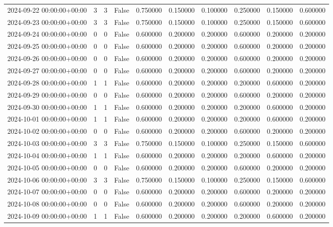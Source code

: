 \begin{tabular}{lrrrrrrrrr}
2024-09-22 00:00:00+00:00 & 3 & 3 & False & 0.750000 & 0.150000 & 0.100000 & 0.250000 & 0.150000 & 0.600000 \\
2024-09-23 00:00:00+00:00 & 3 & 3 & False & 0.750000 & 0.150000 & 0.100000 & 0.250000 & 0.150000 & 0.600000 \\
2024-09-24 00:00:00+00:00 & 0 & 0 & False & 0.600000 & 0.200000 & 0.200000 & 0.600000 & 0.200000 & 0.200000 \\
2024-09-25 00:00:00+00:00 & 0 & 0 & False & 0.600000 & 0.200000 & 0.200000 & 0.600000 & 0.200000 & 0.200000 \\
2024-09-26 00:00:00+00:00 & 0 & 0 & False & 0.600000 & 0.200000 & 0.200000 & 0.600000 & 0.200000 & 0.200000 \\
2024-09-27 00:00:00+00:00 & 0 & 0 & False & 0.600000 & 0.200000 & 0.200000 & 0.600000 & 0.200000 & 0.200000 \\
2024-09-28 00:00:00+00:00 & 1 & 1 & False & 0.600000 & 0.200000 & 0.200000 & 0.200000 & 0.600000 & 0.200000 \\
2024-09-29 00:00:00+00:00 & 0 & 0 & False & 0.600000 & 0.200000 & 0.200000 & 0.600000 & 0.200000 & 0.200000 \\
2024-09-30 00:00:00+00:00 & 1 & 1 & False & 0.600000 & 0.200000 & 0.200000 & 0.200000 & 0.600000 & 0.200000 \\
2024-10-01 00:00:00+00:00 & 1 & 1 & False & 0.600000 & 0.200000 & 0.200000 & 0.200000 & 0.600000 & 0.200000 \\
2024-10-02 00:00:00+00:00 & 0 & 0 & False & 0.600000 & 0.200000 & 0.200000 & 0.600000 & 0.200000 & 0.200000 \\
2024-10-03 00:00:00+00:00 & 3 & 3 & False & 0.750000 & 0.150000 & 0.100000 & 0.250000 & 0.150000 & 0.600000 \\
2024-10-04 00:00:00+00:00 & 1 & 1 & False & 0.600000 & 0.200000 & 0.200000 & 0.200000 & 0.600000 & 0.200000 \\
2024-10-05 00:00:00+00:00 & 0 & 0 & False & 0.600000 & 0.200000 & 0.200000 & 0.600000 & 0.200000 & 0.200000 \\
2024-10-06 00:00:00+00:00 & 3 & 3 & False & 0.750000 & 0.150000 & 0.100000 & 0.250000 & 0.150000 & 0.600000 \\
2024-10-07 00:00:00+00:00 & 0 & 0 & False & 0.600000 & 0.200000 & 0.200000 & 0.600000 & 0.200000 & 0.200000 \\
2024-10-08 00:00:00+00:00 & 0 & 0 & False & 0.600000 & 0.200000 & 0.200000 & 0.600000 & 0.200000 & 0.200000 \\
2024-10-09 00:00:00+00:00 & 1 & 1 & False & 0.600000 & 0.200000 & 0.200000 & 0.200000 & 0.600000 & 0.200000 \\

\end{tabular}
